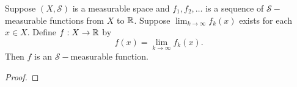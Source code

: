 \documentclass[11pt,a4paper]{book}
\begin{document}
\begin{prop}
   Suppose \( (X, \mathcal{S}) \) is a measurable space and \( {f}_{1}, {f}_{2}, \dots  \) is a sequence of \( \mathcal{S}- \)measurable functions from \( X  \) to \( \mathbb{R}  \). Suppose \( \lim_{ k  \to \infty  }  {f}_{k } (x)  \) exists for each \( x \in X  \). Define \( f: X \to \mathbb{R}  \) by
   \[  f(x) = \lim_{ k  \to  \infty   }  {f}_{k } (x). \]
   Then \( f \) is an \( \mathcal{S}- \)measurable function.
\end{prop}
\begin{proof}

\end{proof}
\end{document}
